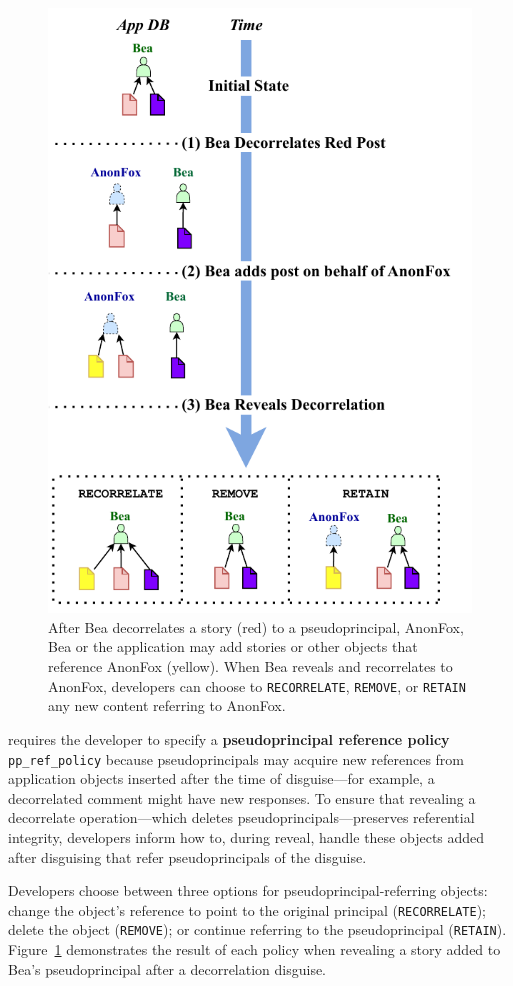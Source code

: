 \begin{figure}
    \centering
    \includegraphics[width=.7\textwidth]{figs/ppreveal_policies}
    \caption[\texttt{RECORRELATE}, \texttt{REMOVE}, and
    \texttt{RETAIN} policies maintain referential integrity for objects added after disguising that refer to
    a pseudoprincipal during reveal.]{After Bea decorrelates a story (red) to a pseudoprincipal,
    AnonFox, Bea or the application may add stories or other objects that
    reference AnonFox (yellow). When Bea reveals and recorrelates to AnonFox, developers
    can choose to \texttt{RECORRELATE}, \texttt{REMOVE}, or \texttt{RETAIN} any
    new content referring to AnonFox.}
\label{f:ppreveal}
\end{figure}
%

\sys requires the developer to specify a \textbf{pseudoprincipal reference
policy} \texttt{pp\_ref\_policy} because pseudoprincipals may acquire new references
from application objects inserted after the time of disguise---for example, a
decorrelated comment might have new responses. To ensure that revealing a
decorrelate operation---which deletes pseudoprincipals---preserves referential
integrity, developers inform \sys how to, during reveal, handle these objects
added after disguising that refer pseudoprincipals of the disguise.%

Developers choose between three options for
pseudoprincipal-referring objects: \one{} change the object's
reference to point to the original principal (\texttt{RECORRELATE});
\two{} delete the object (\texttt{REMOVE}); or \three{} continue
referring to the pseudoprincipal (\texttt{RETAIN}).
Figure~\ref{f:ppreveal} demonstrates the result of each policy when
revealing a story added to Bea's pseudoprincipal after a
decorrelation disguise.


